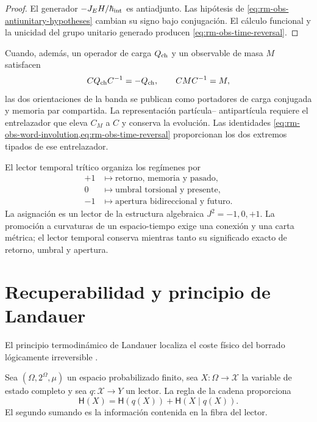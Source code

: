 \begin{proof}
El generador \(-J_EH/\hbar_{\rm int}\) es antiadjunto. Las hip\'otesis de
\cref{eq:rm-obs-antiunitary-hypotheses} cambian su signo bajo conjugaci\'on.
El c\'alculo funcional y la unicidad del grupo unitario generado producen
\cref{eq:rm-obs-time-reversal}.
\end{proof}

Cuando, adem\'as, un operador de carga \(Q_{\rm ch}\) y un observable de
masa \(M\) satisfacen
\begin{equation}
 CQ_{\rm ch}C^{-1}=-Q_{\rm ch},
 \qquad
 CMC^{-1}=M,
 \label{eq:rm-obs-charge-mass-parity}
\end{equation}
las dos orientaciones de la banda se publican como portadores de carga
conjugada y memoria par compartida. La representaci\'on part\'icula--
antipart\'icula requiere el entrelazador que eleva \(C_M\) a \(C\) y
conserva la evoluci\'on. Las identidades
\cref{eq:rm-obs-word-involution,eq:rm-obs-time-reversal} proporcionan los
dos extremos tipados de ese entrelazador.

El lector temporal tr\'itico organiza los reg\'imenes por
\begin{equation}
 \begin{aligned}
 +1&\longmapsto\text{retorno, memoria y pasado},\\
 0&\longmapsto\text{umbral torsional y presente},\\
 -1&\longmapsto\text{apertura bidireccional y futuro}.
 \end{aligned}
 \label{eq:rm-obs-temporal-trit}
\end{equation}
La asignaci\'on es un lector de la estructura algebraica
\(J^2=-1,0,+1\). La promoci\'on a curvaturas de un espacio-tiempo exige una
conexi\'on y una carta m\'etrica; el lector temporal conserva mientras tanto
su significado exacto de retorno, umbral y apertura.

\section{Recuperabilidad y principio de Landauer}

El principio termodin\'amico de Landauer localiza el coste f\'isico del
borrado l\'ogicamente irreversible \cite{Landauer1961}.

Sea \((\Omega,2^\Omega,\mu)\) un espacio probabilizado finito, sea
\(X:\Omega\to\mathcal X\) la variable de estado completo y sea
\(q:\mathcal X\to Y\) un lector. La regla de la cadena proporciona
\begin{equation}
 \mathsf H(X)
 =\mathsf H(q(X))+\mathsf H(X\mid q(X)).
 \label{eq:rm-obs-entropy-chain}
\end{equation}
El segundo sumando es la informaci\'on contenida en la fibra del lector.

